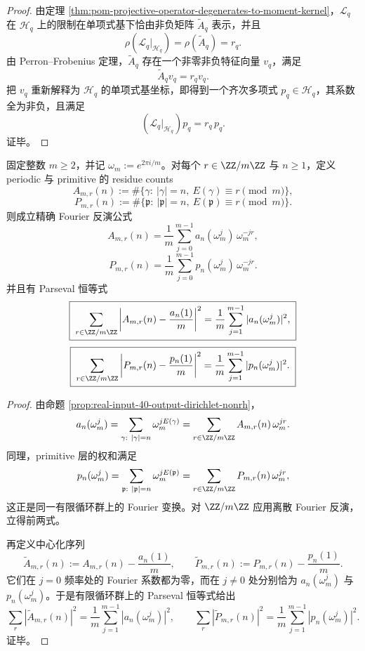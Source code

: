 \begin{proof}
由定理 \ref{thm:pom-projective-operator-degenerates-to-moment-kernel}，\(\mathcal L_q\) 在 \(\mathcal H_q\) 上的限制在单项式基下恰由非负矩阵 \(\widetilde A_q\) 表示，并且
\[
\rho(\mathcal L_q|_{\mathcal H_q})=\rho(\widetilde A_q)=r_q.
\]
由 Perron--Frobenius 定理，\(\widetilde A_q\) 存在一个非零非负特征向量 \(v_q\)，满足
\[
\widetilde A_qv_q=r_qv_q.
\]
把 \(v_q\) 重新解释为 \(\mathcal H_q\) 的单项式基坐标，即得到一个齐次多项式 \(p_q\in \mathcal H_q\)，其系数全为非负，且满足
\[
(\mathcal L_q|_{\mathcal H_q})p_q=r_q\,p_q.
\]
证毕。
\end{proof}

\begin{theorem}\label{thm:xi-dirichlet-residue-fourier-parseval-exact}
固定整数 \(m\ge 2\)，并记 \(\omega_m:=e^{2\pi i/m}\)。对每个 \(r\in\ZZ/m\ZZ\) 与 \(n\ge 1\)，定义 periodic 与 primitive 的 residue counts
\[
A_{m,r}(n):=\#\{\gamma:\ |\gamma|=n,\ E(\gamma)\equiv r\pmod m\},
\]
\[
P_{m,r}(n):=\#\{\mathfrak p:\ |\mathfrak p|=n,\ E(\mathfrak p)\equiv r\pmod m\}.
\]
则成立精确 Fourier 反演公式
\[
\boxed{\;
A_{m,r}(n)=\frac1m\sum_{j=0}^{m-1}a_n(\omega_m^j)\,\omega_m^{-jr},\;}
\]
\[
\boxed{\;
P_{m,r}(n)=\frac1m\sum_{j=0}^{m-1}p_n(\omega_m^j)\,\omega_m^{-jr}.\;}
\]
并且有 Parseval 恒等式
\[
\boxed{\;
\sum_{r\in\ZZ/m\ZZ}
\left|A_{m,r}(n)-\frac{a_n(1)}{m}\right|^2
=
\frac1m\sum_{j=1}^{m-1}|a_n(\omega_m^j)|^2,\;}
\]
\[
\boxed{\;
\sum_{r\in\ZZ/m\ZZ}
\left|P_{m,r}(n)-\frac{p_n(1)}{m}\right|^2
=
\frac1m\sum_{j=1}^{m-1}|p_n(\omega_m^j)|^2.\;}
\]
\end{theorem}
\begin{proof}
由命题 \ref{prop:real-input-40-output-dirichlet-nonrh}，
\[
a_n(\omega_m^j)
=
\sum_{\gamma:\ |\gamma|=n}\omega_m^{jE(\gamma)}
=
\sum_{r\in\ZZ/m\ZZ}A_{m,r}(n)\,\omega_m^{jr}.
\]
同理，primitive 层的权和满足
\[
p_n(\omega_m^j)
=
\sum_{\mathfrak p:\ |\mathfrak p|=n}\omega_m^{jE(\mathfrak p)}
=
\sum_{r\in\ZZ/m\ZZ}P_{m,r}(n)\,\omega_m^{jr},
\]
这正是同一有限循环群上的 Fourier 变换。对 \(\ZZ/m\ZZ\) 应用离散 Fourier 反演，立得前两式。

再定义中心化序列
\[
\widetilde A_{m,r}(n):=A_{m,r}(n)-\frac{a_n(1)}{m},
\qquad
\widetilde P_{m,r}(n):=P_{m,r}(n)-\frac{p_n(1)}{m}.
\]
它们在 \(j=0\) 频率处的 Fourier 系数都为零，而在 \(j\neq 0\) 处分别恰为 \(a_n(\omega_m^j)\) 与 \(p_n(\omega_m^j)\)。于是有限循环群上的 Parseval 恒等式给出
\[
\sum_r |\widetilde A_{m,r}(n)|^2
=
\frac1m\sum_{j=1}^{m-1}|a_n(\omega_m^j)|^2,
\qquad
\sum_r |\widetilde P_{m,r}(n)|^2
=
\frac1m\sum_{j=1}^{m-1}|p_n(\omega_m^j)|^2.
\]
证毕。
\end{proof}

